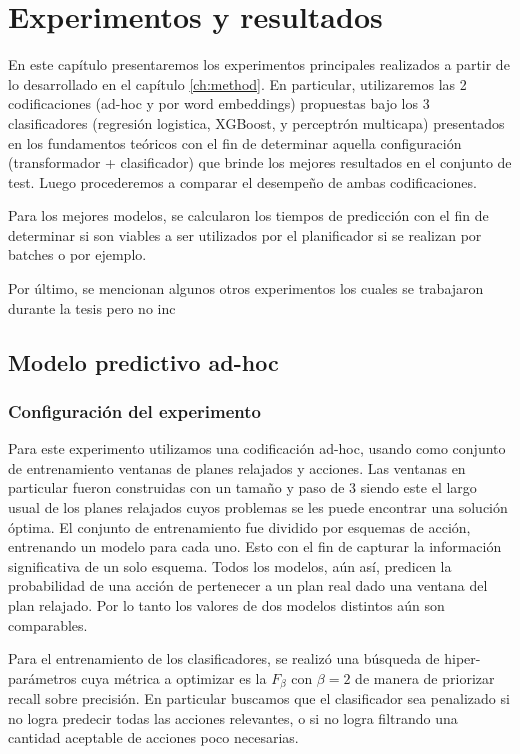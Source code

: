 \chapter{Experimentos y resultados}
\label{ch:results}

En este capítulo presentaremos los experimentos principales realizados a partir de lo desarrollado en el capítulo \ref{ch:method}. En particular, utilizaremos las 2 codificaciones (ad-hoc y por word embeddings) propuestas bajo los 3 clasificadores (regresión logistica, XGBoost, y perceptrón multicapa) presentados en los fundamentos teóricos con el fin de determinar aquella configuración (transformador + clasificador) que brinde los mejores resultados en el conjunto de test. Luego procederemos a comparar el desempeño de ambas codificaciones.

Para los mejores modelos, se calcularon los tiempos de predicción con el fin de determinar si son viables a ser utilizados por el planificador si se realizan por batches o por ejemplo.

Por último, se mencionan algunos otros experimentos los cuales se trabajaron durante la tesis pero no inc

\section{Modelo predictivo ad-hoc}
\label{exp:ad-hoc}

\subsection{Configuración del experimento}

Para este experimento utilizamos una codificación ad-hoc, usando como conjunto de entrenamiento ventanas de planes relajados y acciones. Las ventanas en particular fueron construidas con un tamaño y paso de $3$ siendo este el largo usual de los planes relajados cuyos problemas se les puede encontrar una solución óptima. El conjunto de entrenamiento fue dividido por esquemas de acción, entrenando un modelo para cada uno. Esto con el fin de capturar la información significativa de un solo esquema. Todos los modelos, aún así, predicen la probabilidad de una acción de pertenecer a un plan real dado una ventana del plan relajado. Por lo tanto los valores de dos modelos distintos aún son comparables.

Para el entrenamiento de los clasificadores, se realizó una búsqueda de hiper-parámetros cuya métrica a optimizar es la $F_{\beta}$ con $\beta = 2$ de manera de priorizar recall sobre precisión. En particular buscamos que el clasificador sea penalizado si no logra predecir todas las acciones relevantes, o si no logra filtrando una cantidad aceptable de acciones poco necesarias.

